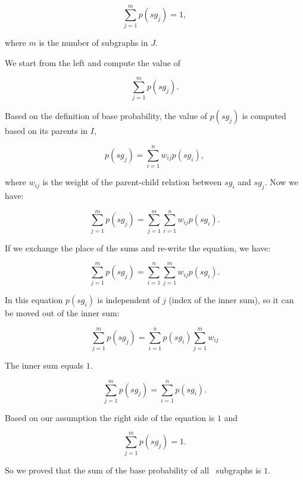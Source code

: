 \begin{equation*}
\sum_{j=1}^m p(sg_j)=1,
\end{equation*}

\noindent
where $m$ is the number of subgraphs in $J$.

We start from the left and compute the value of 

\begin{equation*}
\sum_{j=1}^m p(sg_j).
\end{equation*}

\noindent
Based on the definition of base probability, the value of
$p(sg_j)$ is computed based on its parents in $I$,

\begin{equation*}
p(sg_j)=\sum_{i=1}^n w_{ij}p(sg_i),
\end{equation*}

\noindent
where $w_{ij}$ is the weight of the parent-child relation between
$sg_i$ and $sg_j$.  Now we have:

\begin{equation*}\sum_{j=1}^m p(sg_j) = \sum_{j=1}^m\sum_{i=1}^n w_{ij}p(sg_i).
\end{equation*}

\noindent
If we exchange the place of the sums and re-write the equation, we
have: 

\begin{equation*}
\sum_{j=1}^m p(sg_j) = \sum_{i=1}^n \sum_{j=1}^m w_{ij}p(sg_i).
\end{equation*}

\noindent
In this equation $p(sg_i)$ is independent of $j$ (index of the inner
sum), so it can be moved out of the inner sum:

\begin{equation*}
\sum_{j=1}^m p(sg_j) = \sum_{i=1}^n p(sg_i) \sum_{j=1}^m w_{ij}
\end{equation*}

\noindent
The inner sum equals $1$.

\begin{equation*}
\sum_{j=1}^m p(sg_j) = \sum_{i=1}^n p(sg_i).
\end{equation*}

\noindent
Based on our assumption the right side of the equation is $1$ and 

\begin{equation*}
\sum_{j=1}^m p(sg_j) = 1.
\end{equation*}

\noindent
So we proved that the sum of the base probability of all \knode\
subgraphs is $1$.\QEDB


